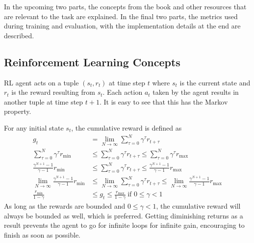 \documentclass{article}
\begin{document}
In the upcoming two parts, the concepts from the book and other resources that are relevant to the task are explained. In the final two parts, the metrics used during training and evaluation, with the implementation details at the end are described. 
\subsection{Reinforcement Learning Concepts}
RL agent acts on a tuple $(s_t,r_t)$ at time step $t$ where $s_t$ is the current state and $r_t$ is the reward resulting from $s_t$. Each action $a_t$ taken by the agent results in another tuple at time step $t+1$. It is easy to see that this has the Markov property. 

For any initial state $s_t$, the cumulative reward is defined as
\begin{align}
    g_t &= \lim_{N\rightarrow\infty}\sum_{\tau=0}^N \gamma^\tau r_{t+\tau}\\
    \sum_{\tau=0}^N \gamma^\tau r_{\min} &\leq\sum_{\tau=0}^N \gamma^\tau r_{t+\tau}\leq\sum_{\tau=0}^N \gamma^\tau r_{\max}\\
    \frac{\gamma^{N+1}-1}{\gamma-1}r_{\min} &\leq\sum_{\tau=0}^N \gamma^\tau r_{t+\tau}\leq\frac{\gamma^{N+1}-1}{\gamma-1}r_{\max}\\
    \lim_{N\rightarrow\infty}\frac{\gamma^{N+1}-1}{\gamma-1}r_{\min} &\leq\lim_{N\rightarrow\infty}\sum_{\tau=0}^N \gamma^\tau r_{t+\tau}\leq\lim_{N\rightarrow\infty}\frac{\gamma^{N+1}-1}{\gamma-1}r_{\max}\\
    \frac{r_{\min}}{1-\gamma} &\leq g_t\leq\frac{r_{\max}}{1-\gamma}\ \scriptstyle{\text{if $0 \leq \gamma < 1$}}
\end{align}
As long as the rewards are bounded and $0 \leq \gamma < 1$, the cumulative reward will always be bounded as well, which is preferred. Getting diminishing returns as a result prevents the agent to go for infinite loops for infinite gain, encouraging to finish as soon as possible.
\end{document}
